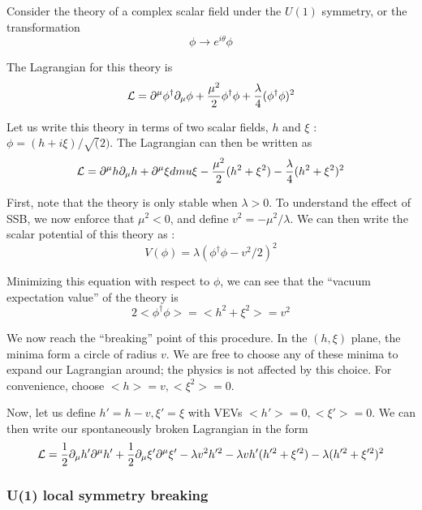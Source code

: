 Consider the theory of a complex scalar field under the $U(1)$ symmetry, or the transformation
\begin{equation}
\phi \rightarrow e^{i\theta} \phi
\end{equation}

The Lagrangian for this theory is
\begin{equation}
\mathcal{L} = \partial^\mu \phi^{\dag} \partial_\mu \phi + \frac{\mu^2}{2} \phi^{\dag} \phi + \frac{\lambda}{4} (\phi^\dag \phi)^2
\end{equation}

Let us write this theory in terms of two scalar fields, $h$ and $\xi$ : $\phi = (h + i\xi) / \sqrt(2)$.
The Lagrangian can then be written as
\begin{equation}
\mathcal{L} = \partial^\mu h \partial_\mu h + \partial^\mu \xi dmu \xi - \frac{\mu^2}{2} (h^2 + \xi^2) - \frac{\lambda}{4}(h^2 + \xi^2)^2
\end{equation}

First, note that the theory is only stable when $\lambda > 0$.
To understand the effect of SSB, we now enforce that $\mu^2 < 0$, and define $v^2 = -\mu^2/\lambda$.
We can then write the scalar potential of this theory as :
\begin{equation}
V(\phi) = \lambda (\phi^\dag \phi - v^2/2)^2
\end{equation}

Minimizing this equation with respect to $\phi$, we can see that the ``vacuum expectation value'' of the theory is
\begin{equation}
2<\phi^\dag \phi> = <h^2 + \xi^2 > = v^2
\end{equation}

We now reach the ``breaking'' point of this procedure.
In the $(h, \xi)$ plane, the minima form a circle of radius $v$.
We are free to choose any of these minima to expand our Lagrangian around; the physics is not affected by this choice.
For convenience, choose $<h> = v, <\xi^2> = 0$.

Now, let us define $h' = h - v , \xi' = \xi $ with VEVs $<h'> = 0 , <\xi'> = 0$.
We can then write our spontaneously broken Lagrangian in the form
\begin{equation}
\mathcal{L} = \frac{1}{2} \partial_\mu h' \partial^\mu h' +  \frac{1}{2} \partial_\mu \xi' \partial^\mu \xi' - \lambda v^2 h'^2 - \lambda v h' (h'^2 + \xi'^2 ) - \lambda (h'^2 + \xi'^2)^2
\end{equation}



\subsubsection{U(1) local  symmetry breaking}

